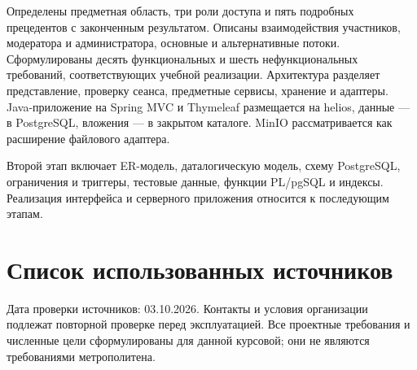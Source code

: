 Определены предметная область, три роли доступа и пять подробных прецедентов с законченным результатом. Описаны взаимодействия участников, модератора и администратора, основные и альтернативные потоки. Сформулированы десять функциональных и шесть нефункциональных требований, соответствующих учебной реализации. Архитектура разделяет представление, проверку сеанса, предметные сервисы, хранение и адаптеры. Java-приложение на Spring MVC и Thymeleaf размещается на helios, данные — в Postgre\allowbreak{}SQL, вложения — в закрытом каталоге. Min\allowbreak{}IO рассматривается как расширение файлового адаптера.

Второй этап включает ER-модель, даталогическую модель, схему Postgre\allowbreak{}SQL, ограничения и триггеры, тестовые данные, функции PL/\allowbreak{}pg\allowbreak{}SQL и индексы. Реализация интерфейса и серверного приложения относится к последующим этапам.

\clearpage
\section*{Список использованных источников}
{}

Дата проверки источников: 03.10.2026. Контакты и условия организации подлежат повторной проверке перед эксплуатацией. Все проектные требования и численные цели сформулированы для данной курсовой; они не являются требованиями метрополитена.

